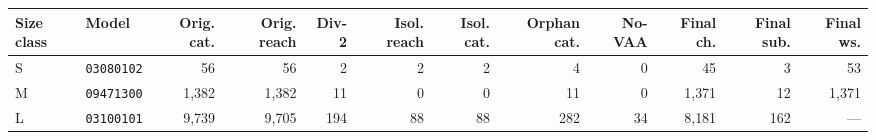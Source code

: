 \begin{tabular}{@{}llrrrrrrrrrr@{}}
\toprule
Size class & Model & Orig. cat. & Orig. reach & Div-2 & Isol. reach & Isol. cat. & Orphan cat. & No-VAA & Final ch. & Final sub. & Final ws. \\
\midrule
S & \texttt{03080102} & 56 & 56 & 2 & 2 & 2 & 4 & 0 & 45 & 3 & 53 \\
M & \texttt{09471300} & 1{,}382 & 1{,}382 & 11 & 0 & 0 & 11 & 0 & 1{,}371 & 12 & 1{,}371 \\
L & \texttt{03100101} & 9{,}739 & 9{,}705 & 194 & 88 & 88 & 282 & 34 & 8{,}181 & 162 & --- \\
\bottomrule
\end{tabular}
